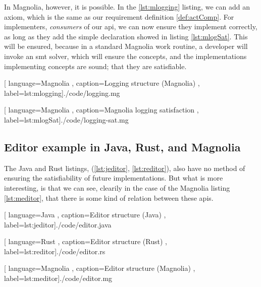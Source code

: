 In Magnolia, however, it is possible. In the \ref{lst:mlogging} listing, we can
add an axiom, which is the same as our requirement definition
\ref{def:actComp}. For implementers, \textit{consumers} of our \gls{api}, we
can now ensure they implement correctly, as long as they add the simple
declaration showed in listing \ref{lst:mlogSat}. This will be ensured, because
in a standard Magnolia work routine, a developer will invoke an \gls{smt}
solver, which will ensure the concepts, and the implementations implementing
concepts are sound; that they are satisfiable.

\begin{center}
  
    [ language=Magnolia
    , caption={Logging structure (Magnolia)}
    , label=lst:mlogging]{./code/logging.mg}
\end{center}

\begin{center}
  
    [ language=Magnolia
    , caption={Magnolia logging satisfaction}
    , label=lst:mlogSat]{./code/logging-sat.mg}
\end{center}

\subsection{Editor example in Java, Rust, and Magnolia}

The Java and Rust listings, (\ref{lst:jeditor}, \ref{lst:reditor}), also have no
method of ensuring the satisfiability of future implementations. But what is
more interesting, is that we can see, clearily in the case of the Magnolia
listing \ref{lst:meditor}, that there is some kind of relation between these
\gls{api}s.

\begin{center}
  
    [ language=Java
    , caption={Editor structure (Java)}
    , label=lst:jeditor]{./code/editor.java}
\end{center}

\begin{center}
  
    [ language=Rust
    , caption={Editor structure (Rust)}
    , label=lst:reditor]{./code/editor.rs}
\end{center}

\begin{center}
  
    [ language=Magnolia
    , caption={Editor structure (Magnolia)}
    , label=lst:meditor]{./code/editor.mg}
\end{center}

